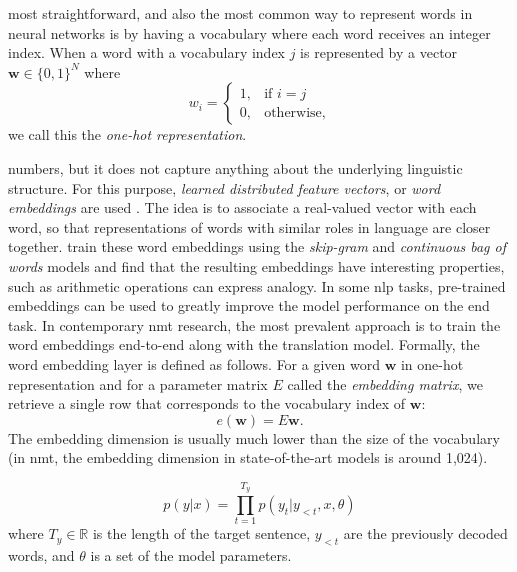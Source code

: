 most straightforward, and also the most common way to represent words in neural
networks is by having a vocabulary where each word receives an integer index.
When a word with a vocabulary index $j$ is represented by a vector $\mathbf{w}
\in \{0,1\}^N$ where
%
\begin{equation} w_i =
\begin{cases} 1, & \text{if } i = j \\ 0, & \text{otherwise,}
\end{cases}
\end{equation}
%
we call this the \emph{one-hot representation}.

numbers, but it does not capture anything about the underlying linguistic
structure.  For this purpose, \emph{learned distributed feature vectors}, or
\emph{word embeddings} are used \citep{bengio2003neural} . The idea is to associate a real-valued vector with each word, so that
representations of words with similar roles in language are closer
together. \citet{mikolov2013distributed} train these word embeddings using the
\emph{skip-gram} and \emph{continuous bag of words} models and find that the
resulting embeddings have interesting properties, such as arithmetic operations
can express analogy.  In some \gls{nlp} tasks, pre-trained embeddings can be
used to greatly improve the model performance on the end task. In contemporary
\gls{nmt} research, the most prevalent approach is to train the word embeddings
end-to-end along with the translation model.  %
 Formally, the word embedding layer is defined as follows. For a
given word $\textbf{w}$ in one-hot representation and for a parameter matrix $E$
called the \emph{embedding matrix}, we retrieve a single row that corresponds to
the vocabulary index of $\mathbf{w}$:
%
\begin{equation}
  e(\mathbf{w}) = E\mathbf{w}.
\end{equation}
%
The embedding dimension is usually much lower than the size of the vocabulary
(in \gls{nmt}, the embedding dimension in state-of-the-art models is around
1,024).

%
\begin{equation}
  p(y|x) = \prod_{t=1}^{T_y}p(y_t|y_{<t},x,\theta)
  \label{eq:output-distribution}
\end{equation}
%
where $T_y \in \mathbb{R}$ is the length of the target sentence, $y_{<t}$ are
the previously decoded words, and $\theta$ is a set of the model parameters.

